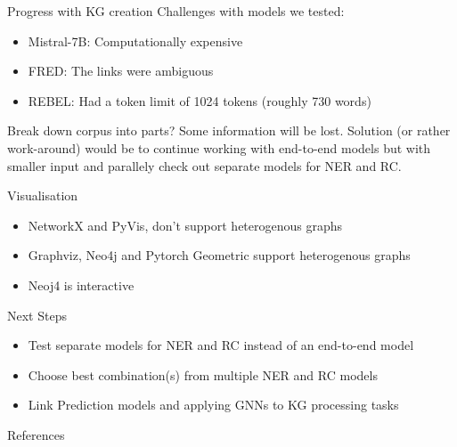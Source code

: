 \documentclass{beamer}
\begin{document}
\begin{frame}{Progress with KG creation}
    Challenges with models we tested:
    \begin{itemize}
        \item Mistral-7B: Computationally expensive
        \item FRED: The links were ambiguous
        \item REBEL: Had a token limit of 1024 tokens (roughly 730 words)
    \end{itemize}
    Break down corpus into parts? Some information will be lost.
    Solution (or rather work-around) would be to continue working with end-to-end models but with smaller input and parallely check out separate models for NER and RC. 
\end{frame}

\begin{frame}{Visualisation}
    \begin{itemize}
        \item NetworkX and PyVis, don't support heterogenous graphs
        \item Graphviz, Neo4j and Pytorch Geometric support heterogenous graphs
        \item Neoj4 is interactive
    \end{itemize}
\end{frame}

\begin{frame}{Next Steps}
    \begin{itemize}
        \item Test separate models for NER and RC instead of an end-to-end model 
        \item Choose best combination(s) from multiple NER and RC models
        \item Link Prediction models and applying GNNs to KG processing tasks
    \end{itemize}
\end{frame}




\begin{frame}{References}
    \printbibliography
\end{frame}
\end{document}
